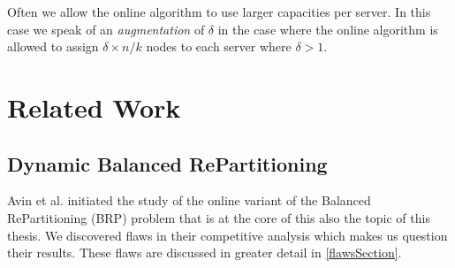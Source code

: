 \documentclass[xcolor=dvipsnames, tikz, 12pt]{article}
\newcommand{\nl}{\newline}
\newcommand{\crep}{C{\scriptsize REP}}
\theoremstyle{definition}
\begin{document}
	Often we allow the online algorithm to use larger capacities per server. In this case we speak of an \textit{augmentation} of $\delta$ in the case where the online algorithm is allowed to assign $\delta\times n/k$ nodes to each server where $\delta>1$.%
	
	\section{Related Work}
	\subsection{Dynamic Balanced RePartitioning}
	Avin et al.\cite{Avin2015a} initiated the study of the online variant of the Balanced RePartitioning (BRP) problem that is at the core of this also the topic of this thesis. We discovered flaws in their competitive analysis which makes us question their results. These flaws are discussed in greater detail in \cref{flawsSection}. %
	
\end{document}
